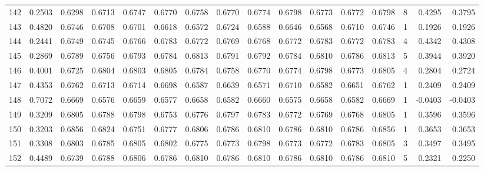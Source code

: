 \begin{tabular}{lrrrrrrrrrrrrrrr}
142 &      0.2503 &  0.6298 &  0.6713 &  0.6747 &  0.6770 &  0.6758 &  0.6770 &  0.6774 &  0.6798 &  0.6773 &   0.6772 &     0.6798 &      8 &                    0.4295 &                     0.3795 \\
143 &      0.4820 &  0.6746 &  0.6708 &  0.6701 &  0.6618 &  0.6572 &  0.6724 &  0.6588 &  0.6646 &  0.6568 &   0.6710 &     0.6746 &      1 &                    0.1926 &                     0.1926 \\
144 &      0.2441 &  0.6749 &  0.6745 &  0.6766 &  0.6783 &  0.6772 &  0.6769 &  0.6768 &  0.6772 &  0.6783 &   0.6772 &     0.6783 &      4 &                    0.4342 &                     0.4308 \\
145 &      0.2869 &  0.6789 &  0.6756 &  0.6793 &  0.6784 &  0.6813 &  0.6791 &  0.6792 &  0.6784 &  0.6810 &   0.6786 &     0.6813 &      5 &                    0.3944 &                     0.3920 \\
146 &      0.4001 &  0.6725 &  0.6804 &  0.6803 &  0.6805 &  0.6784 &  0.6758 &  0.6770 &  0.6774 &  0.6798 &   0.6773 &     0.6805 &      4 &                    0.2804 &                     0.2724 \\
147 &      0.4353 &  0.6762 &  0.6713 &  0.6714 &  0.6698 &  0.6587 &  0.6639 &  0.6571 &  0.6710 &  0.6582 &   0.6651 &     0.6762 &      1 &                    0.2409 &                     0.2409 \\
148 &      0.7072 &  0.6669 &  0.6576 &  0.6659 &  0.6577 &  0.6658 &  0.6582 &  0.6660 &  0.6575 &  0.6658 &   0.6582 &     0.6669 &      1 &                   -0.0403 &                    -0.0403 \\
149 &      0.3209 &  0.6805 &  0.6788 &  0.6798 &  0.6753 &  0.6776 &  0.6797 &  0.6783 &  0.6772 &  0.6769 &   0.6768 &     0.6805 &      1 &                    0.3596 &                     0.3596 \\
150 &      0.3203 &  0.6856 &  0.6824 &  0.6751 &  0.6777 &  0.6806 &  0.6786 &  0.6810 &  0.6786 &  0.6810 &   0.6786 &     0.6856 &      1 &                    0.3653 &                     0.3653 \\
151 &      0.3308 &  0.6803 &  0.6785 &  0.6805 &  0.6802 &  0.6775 &  0.6773 &  0.6798 &  0.6773 &  0.6772 &   0.6783 &     0.6805 &      3 &                    0.3497 &                     0.3495 \\
152 &      0.4489 &  0.6739 &  0.6788 &  0.6806 &  0.6786 &  0.6810 &  0.6786 &  0.6810 &  0.6786 &  0.6810 &   0.6786 &     0.6810 &      5 &                    0.2321 &                     0.2250 \\

\end{tabular}
